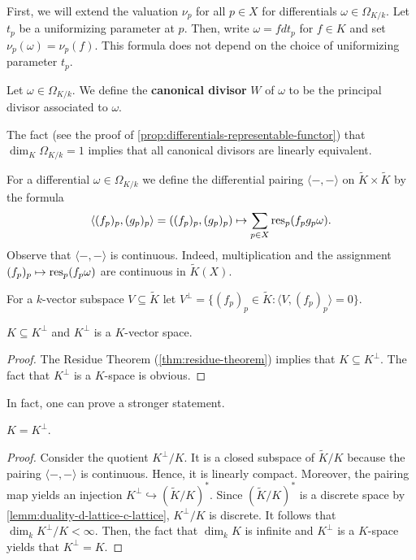 First, we will extend the valuation $\nu_{p}$ for all $p\in X$ for differentials $\omega\in \Omega_{K/k}$. Let $t_{p}$ be a uniformizing parameter at $p$. Then, write $\omega = f dt_{p}$ for $f\in K$ and set $\nu_{p}(\omega) = \nu_{p}(f)$. This formula does not depend on the choice of uniformizing parameter $t_{p}$.
\begin{definition}\label{def:canonical-divisor}
	Let $\omega\in \Omega_{K/k}$. We define the \textbf{canonical divisor} $W$ of $\omega$ to be the principal divisor associated to $\omega$. 
\end{definition}
\begin{remark}\label{rem:canonical-divisor-are-all-linearly-equivalent}
	The fact (see the proof of \cref{prop:differentials-representable-functor}) that $\dim_{K}\Omega_{K/k} = 1$ implies that all canonical divisors are linearly equivalent.
\end{remark}
\begin{definition}\label{def:differential-pairing}
	For a differential $\omega\in \Omega_{K/k}$ we define the differential pairing $\langle -, -\rangle$ on $\widetilde{K} \times \widetilde{K}$ by the formula
	\[{}
		\langle (f_{p})_{p}, (g_{p})_{p}\rangle =  ((f_{p})_{p}, (g_{p})_{p})\mapsto \sum_{p\in X}	\operatorname{res}_{p}(f_{p}g_{p}\omega).
	\]
	Observe that $\langle -,-\rangle$ is continuous. Indeed, multiplication and the assignment $(f_{p})_{p} \mapsto \operatorname{res}_{p}(f_{p}\omega)$ are continuous in $\widetilde{K}(X)$.
\end{definition}
For a $k$-vector subspace $V \subseteq \widetilde{K}$ let $V^{\perp} = \{(f_{p})_{p} \in \widetilde{K}\colon \langle V, (f_{p})_{p}\rangle = 0\}$.
\begin{lemma}\label{lemm:complement-of-K}
	$K \subseteq K^{\perp}$ and $K^{\perp}$ is a $K$-vector space. 
\end{lemma}
\begin{proof}
	The Residue Theorem (\cref{thm:residue-theorem}) implies that $K \subseteq K^{\perp}$. The fact that $K^{\perp}$ is a $K$-space is obvious.
\end{proof}
In fact, one can prove a stronger statement.
\begin{lemma}\label{lemm:K-equals-its-complement}
	$K = K^{\perp}$.
\end{lemma}
\begin{proof}
	Consider the quotient $K^{\perp}/K$. It is a closed subspace of $\widetilde{K}/K$ because the pairing $\langle -,-\rangle$ is continuous. Hence, it is linearly compact. Moreover, the pairing map yields an injection $K^{\perp} \hookrightarrow (\widetilde{K}/K)^{*}$. Since $(\widetilde{K}/K)^{*}$ is a discrete space by \cref{lemm:duality-d-lattice-c-lattice}, $K^{\perp}/K$ is discrete. It follows that $\dim_{k}K^{\perp}/K < \infty$. Then, the fact that $\dim_{k} K$ is infinite and $K^{\perp}$ is a $K$-space yields that $K^{\perp} = K$.
\end{proof}
